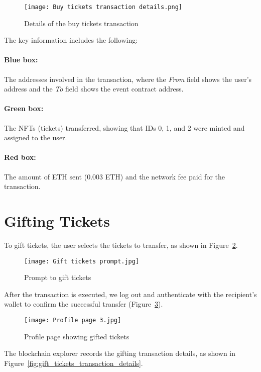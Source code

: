 \begin{figure}[H]
    \texttt{[image: Buy tickets transaction details.png]}
    \centering
    \caption{Details of the buy tickets transaction}\label{fig:buy_tickets_transaction_details}
\end{figure}

The key information includes the following:
\paragraph{Blue box:} The addresses involved in the transaction, where the \textit{From} field shows
the user's address and the \textit{To} field shows the event contract address.
\paragraph{Green box:} The NFTs (tickets) transferred, showing that IDs 0, 1, and 2 were minted and
assigned to the user.
\paragraph{Red box:} The amount of ETH sent (0.003 ETH) and the network fee paid for the
transaction.

\section{Gifting Tickets}\label{sec:gifting_tickets}

To gift tickets, the user selects the tickets to transfer, as shown in
Figure~\ref{fig:gift_tickets_prompt}.

\begin{figure}[H]
    \texttt{[image: Gift tickets prompt.jpg]}
    \centering
    \caption{Prompt to gift tickets}\label{fig:gift_tickets_prompt}
\end{figure}

After the transaction is executed, we log out and authenticate with the
recipient's wallet to confirm the successful transfer
(Figure~\ref{fig:profile_page_3}).

\begin{figure}[H]
    \texttt{[image: Profile page 3.jpg]}
    \centering
    \caption{Profile page showing gifted tickets}\label{fig:profile_page_3}
\end{figure}

The blockchain explorer records the gifting transaction details, as shown in
Figure~\ref{fig:gift_tickets_transaction_details}.

